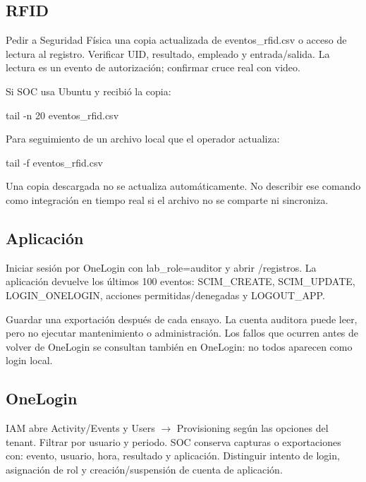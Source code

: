 \documentclass[12pt,a4paper]{article}
\begin{document}
\subsection*{RFID}
Pedir a Seguridad Física una copia actualizada de \textnormal{eventos\_\allowbreak{}rfid.csv} o acceso de lectura al registro. Verificar UID, resultado, empleado y entrada/salida. La lectura es un evento de autorización; confirmar cruce real con video.\par
Si SOC usa Ubuntu y recibió la copia:\par
{}
\begin{Comandos}
tail -n 20 eventos_rfid.csv
\end{Comandos}
Para seguimiento de un archivo local que el operador actualiza:\par
{}
\begin{Comandos}
tail -f eventos_rfid.csv
\end{Comandos}
Una copia descargada no se actualiza automáticamente. No describir ese comando como integración en tiempo real si el archivo no se comparte ni sincroniza.\par
{}\subsection*{Aplicación}
Iniciar sesión por OneLogin con \textnormal{lab\_\allowbreak{}role=\allowbreak{}auditor} y abrir \textnormal{/\allowbreak{}registros}. La aplicación devuelve los últimos 100 eventos: SCIM\_CREATE, SCIM\_UPDATE, LOGIN\_ONELOGIN, acciones permitidas/denegadas y LOGOUT\_APP.\par
Guardar una exportación después de cada ensayo. La cuenta auditora puede leer, pero no ejecutar mantenimiento o administración. Los fallos que ocurren antes de volver de OneLogin se consultan también en OneLogin: no todos aparecen como login local.\par
{}\subsection*{OneLogin}
IAM abre Activity/Events y Users \(\rightarrow\) Provisioning según las opciones del tenant. Filtrar por usuario y periodo. SOC conserva capturas o exportaciones con: evento, usuario, hora, resultado y aplicación. Distinguir intento de login, asignación de rol y creación/suspensión de cuenta de aplicación.\par
\end{document}
